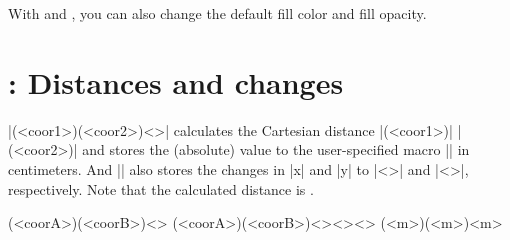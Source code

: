 With \icmd{\settzfillcolor} and \icmd{\settzfillopacity}, you can also change the default fill color and fill opacity.


\begin{tzcode}{.3}
{}
\end{tzcode}


\begin{tzcode}{.3}
{}
\end{tzcode}


\section{\protect\cmd{\tzdistance}: Distances and changes}
\label{s:tzdistance}

\icmd{\tzdistance}|(<coor1>)(<coor2>){<\mylength>}| calculates the Cartesian distance  |(<coor1>)|  |(<coor2>)| and stores the (absolute) value to the user-specified macro |\mylength| in centimeters. 
And |\tzdistance| also stores the changes in |x| and |y| to |{<\Deltax>}| and |{<\Deltay>}|, respectively.
Note that the calculated distance is .

\begin{tzdef}
\tzdistance(<coorA>)(<coorB>){<\mylength>}
\tzdistance(<coorA>)(<coorB>){<\mylength>}{<\Deltax>}{<\Deltay>}
  (<m>)(<m>){<m>}{}{}
\end{tzdef}

\begin{tzcode}{.3}
{}
\end{tzcode}

